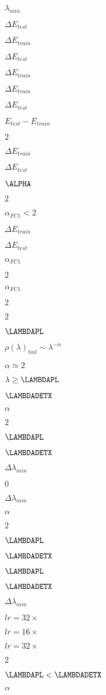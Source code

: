$\lambda_{min}$

$\Delta E_{test}$

$\Delta E_{train}$

$\Delta E_{test}$

$\Delta E_{train}$

$\Delta E_{train}$

$\Delta E_{test}$

$E_{test} - E_{train}$

$2$

$\Delta E_{train}$

$\Delta E_{test}$

$\ALPHA$

$2$

$\alpha_{FC1} < 2$

$\Delta E_{train}$

$\Delta E_{test}$

$\alpha_{FC1}$

$2$

$\alpha_{FC1}$

$2$

$2$


$\LAMBDAPL$

$\rho(\lambda)_{tail}\sim\lambda^{-\alpha}$

$\alpha\simeq2$

$\lambda\ge\LAMBDAPL$

$\LAMBDADETX$

$\alpha$

$2$

$\LAMBDAPL$

$\LAMBDADETX$

$\Delta \lambda_{min}$

$0$

$\Delta \lambda_{min}$

$\alpha$

$2$

$\LAMBDAPL$

$\LAMBDADETX$

$\LAMBDAPL$

$\LAMBDADETX$

$\Delta \lambda_{min}$

$lr=32\times$

$lr=16\times$

$lr=32\times$

$2$

$\LAMBDAPL < \LAMBDADETX$

$\alpha$

